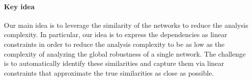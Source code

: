 



\paragraph{Key idea}
Our main idea is to leverage the similarity of the networks to reduce the analysis complexity. In particular, our idea is to express the dependencies as linear constraints in order to reduce the analysis complexity to be as low as the complexity of analyzing the global robustness of a single network. The challenge is to automatically identify these similarities and capture them via linear constraints that approximate the true similarities as close as possible.

